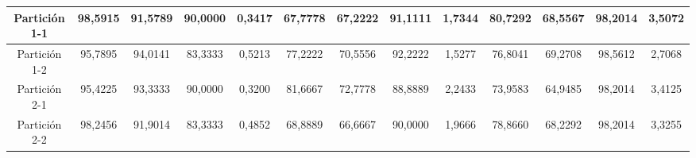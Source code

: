\documentclass[12pt]{article}
\begin{document}
\begin{table}[H]
{\begin{tabular}{|c|cccc|cccc|cccc|}
Partición 1-1 & \multicolumn{1}{c|}{98,5915}                                                  & \multicolumn{1}{c|}{91,5789}                                                 & \multicolumn{1}{c|}{90,0000} & 0,3417 & \multicolumn{1}{c|}{67,7778}                                                  & \multicolumn{1}{c|}{67,2222}                                                 & \multicolumn{1}{c|}{91,1111} & 1,7344 & \multicolumn{1}{c|}{80,7292}                                                  & \multicolumn{1}{c|}{68,5567}                                                 & \multicolumn{1}{c|}{98,2014} & 3,5072 \\ \hline
Partición 1-2 & \multicolumn{1}{c|}{95,7895}                                                  & \multicolumn{1}{c|}{94,0141}                                                 & \multicolumn{1}{c|}{83,3333} & 0,5213 & \multicolumn{1}{c|}{77,2222}                                                  & \multicolumn{1}{c|}{70,5556}                                                 & \multicolumn{1}{c|}{92,2222} & 1,5277 & \multicolumn{1}{c|}{76,8041}                                                  & \multicolumn{1}{c|}{69,2708}                                                 & \multicolumn{1}{c|}{98,5612} & 2,7068 \\ \hline
Partición 2-1 & \multicolumn{1}{c|}{95,4225}                                                  & \multicolumn{1}{c|}{93,3333}                                                 & \multicolumn{1}{c|}{90,0000} & 0,3200 & \multicolumn{1}{c|}{81,6667}                                                  & \multicolumn{1}{c|}{72,7778}                                                 & \multicolumn{1}{c|}{88,8889} & 2,2433 & \multicolumn{1}{c|}{73,9583}                                                  & \multicolumn{1}{c|}{64,9485}                                                 & \multicolumn{1}{c|}{98,2014} & 3,4125 \\ \hline
Partición 2-2 & \multicolumn{1}{c|}{98,2456}                                                  & \multicolumn{1}{c|}{91,9014}                                                 & \multicolumn{1}{c|}{83,3333} & 0,4852 & \multicolumn{1}{c|}{68,8889}                                                  & \multicolumn{1}{c|}{66,6667}                                                 & \multicolumn{1}{c|}{90,0000} & 1,9666 & \multicolumn{1}{c|}{78,8660}                                                  & \multicolumn{1}{c|}{68,2292}                                                 & \multicolumn{1}{c|}{98,2014} & 3,3255 \\ \hline

\end{tabular}}
\end{table}
\end{document}
